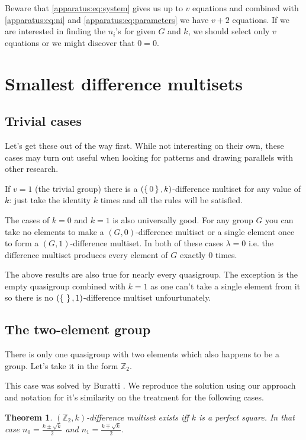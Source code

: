 \documentclass{article}
\theoremstyle{plain}
\newtheorem{theorem}{Theorem}[section]
\theoremstyle{definition}
\theoremstyle{remark}
\begin{document}
		Beware that \eqref{apparatus:eq:system} gives us up to $v$ equations and combined with \eqref{apparatus:eq:ni} and \eqref{apparatus:eq:parameters} we have $v+2$ equations. If we are interested in finding the $n_i$'s for given $G$ and $k$, we should select only $v$ equations or we might discover that $0=0$.
		
		
	\section{Smallest difference multisets}
		\subsection{Trivial cases}
			Let's get these out of the way first. While not interesting on their own, these cases may turn out useful when looking for patterns and drawing parallels with other research.
			
			If $v=1$ (the trivial group) there is a $(\set{0},k)$-difference multiset for any value of $k$: just take the identity $k$ times and all the rules will be satisfied.
			
			The cases of $k=0$ and $k=1$ is also universally good. For any group $G$ you can take no elements to make a $(G,0)$-difference multiset or a single element once to form a $(G,1)$-difference multiset. In both of these cases $\lambda=0$ i.e. the difference multiset produces every element of $G$ exactly $0$ times.
			
			The above results are also true for nearly every quasigroup. The exception is the empty quasigroup combined with $k=1$ as one can't take a single element from it so there is no $(\set{}, 1)$-difference multiset unfourtunately.
			
		\subsection{The two-element group}
			There is only one quasigroup with two elements which also happens to be a group. Let's take it in the form $\mathbb Z_2$.
		
			This case was solved by Buratti \cite{buratti1999old}. We reproduce the solution using our approach and notation for it's similarity on the treatment for the following cases.
			
			\begin{theorem}
				$(\mathbb Z_2,k)$-difference multiset exists iff $k$ is a perfect square. In that case $n_0 = \frac{k \pm \sqrt k}{2}$ and $n_1 = \frac{k \mp \sqrt k}{2}$.
			\end{theorem}
			
\end{document}
